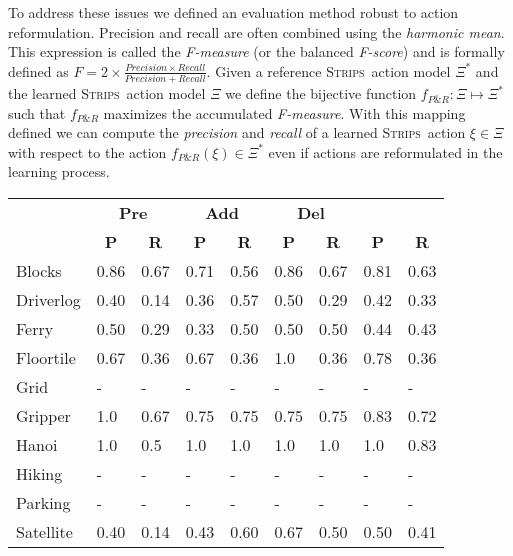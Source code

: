 \documentclass{article}
\newcommand{\strips}{\textsc{Strips}}     %
\begin{document}
To address these issues we defined an evaluation method robust to action reformulation. Precision and recall are often combined using the {\em harmonic mean}. This expression is called the {\em F-measure} (or the balanced {\em F-score}) and is formally defined as $F=2\times\frac{Precision\times Recall}{Precision+Recall}$. Given a reference \strips\ action model $\Xi^*$ and the learned \strips\ action model $\Xi$ we define the bijective function $f_{P\&R}:\Xi \mapsto \Xi^*$ such that $f_{P\&R}$ maximizes the accumulated {\em F-measure}. With this mapping defined we can compute the {\em precision} and {\em recall} of a learned \strips\ action $\xi\in\Xi$ with respect to the action $f_{P\&R}(\xi)\in \Xi^*$ even if actions are reformulated in the learning process.


\begin{table}
		\begin{center}
\begin{scriptsize}                
				\begin{tabular}{l|l|l|l|l|l|l||l|l|}
					& \multicolumn{2}{|c|}{\bf Pre} & \multicolumn{2}{|c|}{\bf Add} & \multicolumn{2}{|c||}{\bf Del} & \multicolumn{2}{|c}{\bf}\\ \cline{2-9}			
					& \multicolumn{1}{|c|}{\bf P} & \multicolumn{1}{|c|}{\bf R} & \multicolumn{1}{|c|}{\bf P} & \multicolumn{1}{|c|}{\bf R} & \multicolumn{1}{|c|}{\bf P} & \multicolumn{1}{|c||}{\bf R} &  \multicolumn{1}{|c|}{\bf P} & \multicolumn{1}{|c|}{\bf R} \\
					\hline
					Blocks & 0.86 & 0.67 & 0.71 & 0.56 & 0.86 & 0.67 & 0.81 & 0.63 \\
					Driverlog & 0.40 & 0.14 & 0.36 & 0.57 & 0.50 & 0.29 & 0.42 & 0.33 \\
					Ferry & 0.50 & 0.29 & 0.33 & 0.50 & 0.50 & 0.50 & 0.44 & 0.43 \\
					Floortile & 0.67 & 0.36 & 0.67 & 0.36 & 1.0 & 0.36 & 0.78 & 0.36 \\
					Grid & - & - & - & - & - & - & - & - \\ %
					Gripper & 1.0 & 0.67 & 0.75 & 0.75 & 0.75 & 0.75 & 0.83 & 0.72 \\
					Hanoi & 1.0 & 0.5 & 1.0 & 1.0 & 1.0 & 1.0 & 1.0 & 0.83 \\
					Hiking & - & - & - & - & - & - & - & - \\ %
					Parking & - & - & - & - & - & - & - & - \\ %
					Satellite & 0.40 & 0.14 & 0.43 & 0.60 & 0.67 & 0.50 & 0.50 & 0.41 \\

\end{tabular}
\end{scriptsize}
\end{center}
\end{table}
\end{document}
